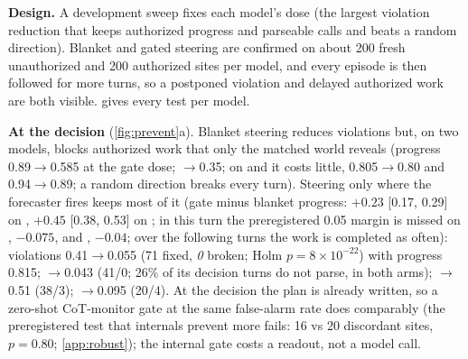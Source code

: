 \documentclass{article}
\begin{document}


\textbf{Design.} A development sweep fixes each model's dose (the largest violation reduction that keeps authorized progress and parseable calls and beats a random direction). Blanket and gated steering are confirmed on about 200 fresh unauthorized and 200 authorized sites per model, and every episode is then followed for more turns, so a postponed violation and delayed authorized work are both visible.  gives every test per model.

\textbf{At the decision} (\cref{fig:prevent}a). Blanket steering reduces violations but, on two models, blocks authorized work that only the matched world reveals (\Gemma progress 0.89$\rightarrow$0.585 at the gate dose; $\rightarrow$0.35; on \Oss and \Muse it costs little, 0.805$\rightarrow$0.80 and 0.94$\rightarrow$0.89; a random direction breaks every turn). Steering only where the forecaster fires keeps most of it (gate minus blanket progress: $+0.23$ [0.17, 0.29] on \Gemma, $+0.45$ [0.38, 0.53] on \Qwen; in this turn the preregistered 0.05 margin is missed on \Gemma, $-0.075$, and \Qwen, $-0.04$; over the following turns the work is completed as often): \Gemma violations 0.41$\rightarrow$0.055 (71 fixed, \emph{0} broken; Holm $p=8\times10^{-22}$) with progress 0.815; $\rightarrow$0.043 (41/0; 26\% of its decision turns do not parse, in both arms); $\rightarrow$0.51 (38/3); $\rightarrow$0.095 (20/4). At the decision the plan is already written, so a zero-shot CoT-monitor gate at the same false-alarm rate does comparably (the preregistered test that internals prevent more fails: 16 vs 20 discordant sites, $p=0.80$; \cref{app:robust}); the internal gate costs a readout, not a model call.
\end{document}
